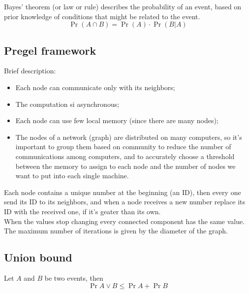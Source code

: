     \begin{defn}
        Bayes’ theorem (or law or rule) describes the probability of an event, based on prior knowledge of conditions that might be related to the event.
        \begin{equation}\label{eq-bayes}
            \Pr{(A \cap B)} = \Pr{(A)} \cdot \Pr{(B | A)}
        \end{equation}
    \end{defn}


\subsection{Pregel framework}

    Brief description:
    \begin{itemize}
        \item Each node can communicate only with its neighbors;
        \item The computation si asynchronous;
        \item Each node can use few local memory (since there are many nodes);
        \item The nodes of a network (graph) are distributed on many computers, so it's important to group them based on community to reduce the number of communications among computers, and to accurately choose a threshold between the memory to assign to each node and the number of nodes we want to put into each single machine.
    \end{itemize}
    
    \begin{ex}
        Each node contains a unique number at the beginning (an ID), then every one send its ID to its neighbors, and when a node receives a new number replace its ID with the received one, if it's geater than its own. \\
        When the values stop changing every connected component has the same value.
        The maximum number of iterations is given by the diameter of the graph.
    \end{ex}


\subsection{Union bound}

	\begin{defn}
        Let $A$ and $B$ be two events, then
        \begin{equation}\label{eq:union-bound}
            \Pr{A \vee B} \leq \Pr{A} + \Pr{B}
        \end{equation}
    \end{defn}

